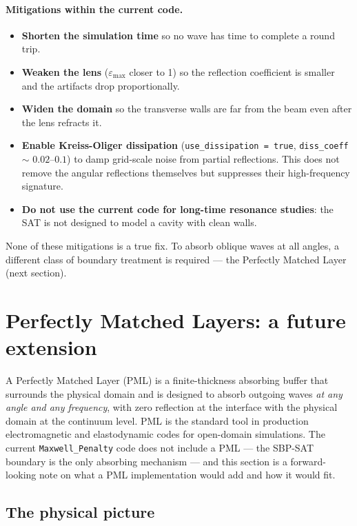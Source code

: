\documentclass[11pt]{article}
\begin{document}
\paragraph{Mitigations within the current code.}
\begin{itemize}
  \item \textbf{Shorten the simulation time} so no wave has time to
        complete a round trip.
  \item \textbf{Weaken the lens} ($\varepsilon_{\max}$ closer to 1) so
        the reflection coefficient is smaller and the artifacts drop
        proportionally.
  \item \textbf{Widen the domain} so the transverse walls are far
        from the beam even after the lens refracts it.
  \item \textbf{Enable Kreiss-Oliger dissipation}
        (\texttt{use\_dissipation = true}, \texttt{diss\_coeff} $\sim$
        $0.02$--$0.1$) to damp grid-scale noise from partial
        reflections. This does not remove the angular reflections
        themselves but suppresses their high-frequency signature.
  \item \textbf{Do not use the current code for
        long-time resonance studies}: the SAT is not designed to model
        a cavity with clean walls.
\end{itemize}

None of these mitigations is a true fix. To absorb oblique waves at all
angles, a different class of boundary treatment is required —
the Perfectly Matched Layer (next section).

\section{Perfectly Matched Layers: a future extension}
\label{sec:pml}

A Perfectly Matched Layer (PML) is a finite-thickness absorbing buffer
that surrounds the physical domain and is designed to absorb outgoing
waves \emph{at any angle and any frequency}, with zero reflection at
the interface with the physical domain at the continuum level. PML
is the standard tool in production electromagnetic and elastodynamic
codes for open-domain simulations. The current \texttt{Maxwell\_Penalty}
code does not include a PML — the SBP-SAT boundary is the only
absorbing mechanism — and this section is a forward-looking note on
what a PML implementation would add and how it would fit.

\subsection{The physical picture}
\end{document}
